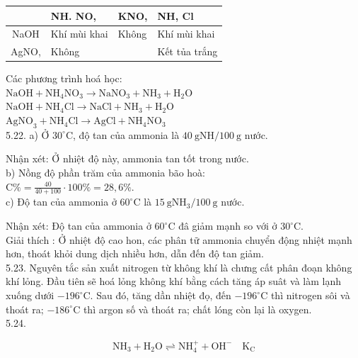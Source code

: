 \documentclass[10pt]{article}
\begin{document}
\begin{center}
\begin{tabular}{|c|l|l|l|}
\hline
 & NH. NO, & KNO, & NH, Cl \\
\hline
NaOH & Khí mùi khai & Không & Khí mùi khai \\
\hline
\multirow{2}{*}{AgNO,} & Không &  & Kết tủa trắng \\
\hline
\end{tabular}
\end{center}

Các phương trình hoá học:\\
$\mathrm{NaOH}+\mathrm{NH}_{4} \mathrm{NO}_{3} \longrightarrow \mathrm{NaNO}_{3}+\mathrm{NH}_{3}+\mathrm{H}_{2} \mathrm{O}$\\
$\mathrm{NaOH}+\mathrm{NH}_{4} \mathrm{Cl} \longrightarrow \mathrm{NaCl}+\mathrm{NH}_{3}+\mathrm{H}_{2} \mathrm{O}$\\
$\mathrm{AgNO}_{3}+\mathrm{NH}_{4} \mathrm{Cl} \longrightarrow \mathrm{AgCl}+\mathrm{NH}_{4} \mathrm{NO}_{3}$\\
5.22. a) Ở $30^{\circ} \mathrm{C}$, độ tan của ammonia là $40 \mathrm{~g} \mathrm{NH} / 100 \mathrm{~g}$ nước.

Nhận xét: Ở nhiệt độ này, ammonia tan tốt trong nước.\\
b) Nồng độ phần trăm của ammonia bão hoà:\\
$\mathrm{C} \%=\frac{40}{40+100} \cdot 100 \%=28,6 \%$.\\
c) Độ tan của ammonia ở $60^{\circ} \mathrm{C}$ là $15 \mathrm{~g} \mathrm{NH}_{3} / 100 \mathrm{~g}$ nước.

Nhận xét: Độ tan của ammonia ở $60^{\circ} \mathrm{C}$ đâ giảm mạnh so với ở $30^{\circ} \mathrm{C}$.\\
Giải thích : Ở nhiệt độ cao hon, các phân tữ ammonia chuyển động nhiệt mạnh hơn, thoát khỏi dung dịch nhiều hơn, dẫn đến độ tan giảm.\\
5.23. Nguyên tắc sản xuất nitrogen từ không khí là chưng cất phân đoạn không khí lỏng. Đầu tiên sẽ hoá lỏng không khí bằng cách tăng áp suât và làm lạnh xuống dưới $-196^{\circ} \mathrm{C}$. Sau đó, tăng dần nhiệt đọ, đến $-196^{\circ} \mathrm{C}$ thì nitrogen sôi và thoát ra; $-186^{\circ} \mathrm{C}$ thì argon số và thoát ra; chất lóng còn lại là oxygen.\\
5.24.

$$
\mathrm{NH}_{3}+\mathrm{H}_{2} \mathrm{O} \rightleftharpoons \mathrm{NH}_{4}^{+}+\mathrm{OH}^{-} \quad \mathrm{K}_{\mathrm{C}}
$$
\end{document}
